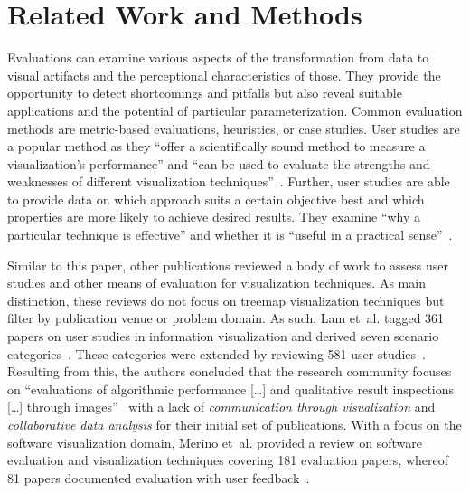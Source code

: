 \documentclass[sigconf,
natbib=true]{acmart}
\begin{document}
\section{Related Work and Methods} %
\label{sec:preliminaries}

Evaluations can examine various aspects of the transformation from data to visual artifacts and the perceptional characteristics of those.
They provide the opportunity to detect shortcomings and pitfalls but also reveal suitable applications and the potential of particular parameterization.
Common evaluation methods are metric-based evaluations, heuristics, or case studies.
User studies are a popular method as they \enquote{offer a scientifically sound method to measure a visualization's performance} and \enquote{can be used to evaluate the strengths and weaknesses of different visualization techniques}~\cite{kosara2003-userstudies}.
Further, user studies are able to provide data on which approach suits a certain objective best and which properties are more likely to achieve desired results.
They examine \enquote{why a particular technique is effective} and whether it is \enquote{useful in a practical sense}~\cite{kosara2003-userstudies}.

Similar to this paper, other publications reviewed a body of work to assess user studies and other means of evaluation for visualization techniques.
As main distinction, these reviews do not focus on treemap visualization techniques but filter by publication venue or problem domain.
As such, Lam et~al. tagged 361 papers on user studies in information visualization and derived seven scenario categories~\cite{lam2012-empirical}.
These categories were extended by reviewing 581 user studies~\cite{isenberg2013-review}.
Resulting from this, the authors concluded that the research community focuses on \enquote{evaluations of algorithmic performance [\ldots] and qualitative result inspections [\ldots] through images}~\cite{isenberg2013-review} with a lack of \emph{communication through visualization} and \emph{collaborative data analysis} for their initial set of publications.
With a focus on the software visualization domain, Merino et~al. provided a review on software evaluation and visualization techniques covering 181 evaluation papers, whereof 81 papers documented evaluation with user feedback~\cite{merino2018-review}.
\end{document}
